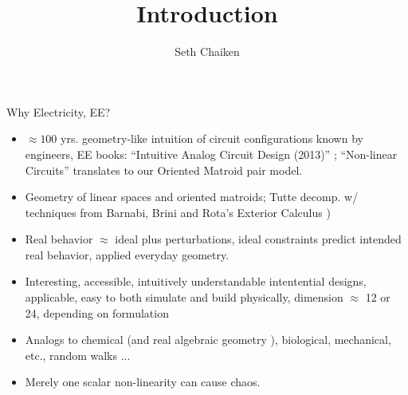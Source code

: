 \documentclass{beamer}
\title{Introduction}
\author{Seth Chaiken}
\begin{document}
\begin{frame}
 \titlepage
\end{frame}


\begin{frame}{Why Electricity, EE?}
\begin{itemize}
\item $\approx 100$ yrs. geometry-like intuition of
circuit configurations known by engineers, EE books:
``Intuitive Analog Circuit Design (2013)''
\cite{intuitAna}; ``Non-linear Circuits'' \cite{HaslerNeirynck}
translates to our Oriented Matroid pair model.

\item Geometry of linear spaces and oriented matroids;
Tutte decomp. w/
techniques from Barnabi, Brini and Rota's Exterior Calculus 
\cite{exteriorCalc})

\item
Real behavior $\approx$ ideal plus perturbations,
ideal constraints predict intended real behavior,
applied everyday geometry.

\item 
Interesting, accessible, intuitively understandable
intentential designs, applicable,
easy to both simulate and build physically, dimension
$\approx$
12 or 24, depending on formulation
\item
Analogs to chemical (and real algebraic geometry 
\cite{signsInChemRAG}), biological, mechanical, etc., random walks ...
\item
Merely one scalar non-linearity can cause chaos.
\end{itemize}
\end{frame}

\end{document}
